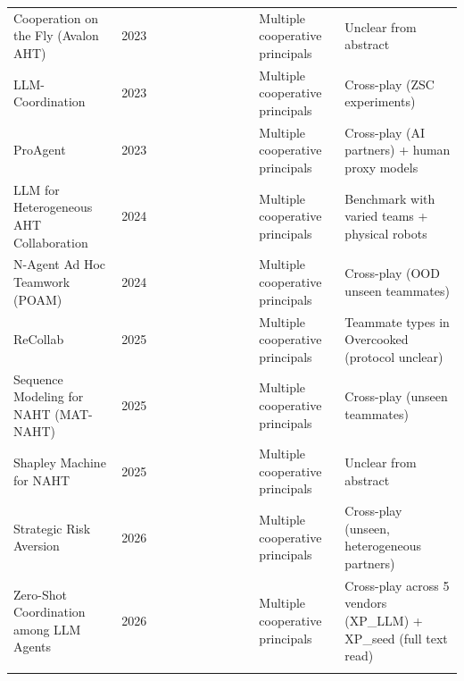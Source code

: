 \documentclass[conference]{IEEEtran}
\newcommand{\full}{{\small\CIRCLE}}
\newcommand{\half}{{\small\LEFTcircle}}
\newcommand{\none}{{\small\Circle}}
\begin{document}
{\begin{longtable}{>{\raggedright\arraybackslash}p{4.2cm} c cccccccc >{\raggedright\arraybackslash}p{3.6cm} >{\raggedright\arraybackslash}p{4.4cm}}
Cooperation on the Fly (Avalon AHT) \cite{shi2023avalon} & 2023 & \half{} & \none{} & \none{} & \none{} & \none{} & \none{} & \none{} & \none{} & Multiple cooperative principals & Unclear from abstract \\
LLM-Coordination \cite{agashe2023llmcoord} & 2023 & \full{} & \none{} & \none{} & \none{} & \none{} & \none{} & \none{} & \none{} & Multiple cooperative principals & Cross-play (ZSC experiments) \\
ProAgent \cite{zhang2024proagent} & 2023 & \full{} & \none{} & \none{} & \none{} & \none{} & \none{} & \none{} & \none{} & Multiple cooperative principals & Cross-play (AI partners) + human proxy models \\
LLM for Heterogeneous AHT Collaboration \cite{liu2024heteroaht} & 2024 & \half{} & \none{} & \none{} & \none{} & \none{} & \none{} & \none{} & \none{} & Multiple cooperative principals & Benchmark with varied teams + physical robots \\
N-Agent Ad Hoc Teamwork (POAM) \cite{wang2024naht} & 2024 & \full{} & \half{} & \none{} & \none{} & \none{} & \none{} & \none{} & \none{} & Multiple cooperative principals & Cross-play (OOD unseen teammates) \\
ReCollab \cite{wallace2025recollab} & 2025 & \half{} & \half{} & \none{} & \none{} & \none{} & \none{} & \none{} & \none{} & Multiple cooperative principals & Teammate types in Overcooked (protocol unclear) \\
Sequence Modeling for NAHT (MAT-NAHT) \cite{wang2025matnaht} & 2025 & \full{} & \none{} & \none{} & \none{} & \none{} & \none{} & \none{} & \none{} & Multiple cooperative principals & Cross-play (unseen teammates) \\
Shapley Machine for NAHT \cite{wang2025shapley} & 2025 & \half{} & \none{} & \none{} & \none{} & \none{} & \none{} & \none{} & \none{} & Multiple cooperative principals & Unclear from abstract \\
Strategic Risk Aversion \cite{qu2026riskaversion} & 2026 & \full{} & \none{} & \none{} & \none{} & \none{} & \none{} & \none{} & \none{} & Multiple cooperative principals & Cross-play (unseen, heterogeneous partners) \\
Zero-Shot Coordination among LLM Agents \cite{hayler2026zsc} & 2026 & \full{} & \none{} & \none{} & \none{} & \none{} & \none{} & \none{} & \none{} & Multiple cooperative principals & Cross-play across 5 vendors (XP\_LLM) + XP\_seed (full text read) \\
\multicolumn{12}{l}{\textit{Negotiation}} \\

\end{longtable}}
\end{document}
